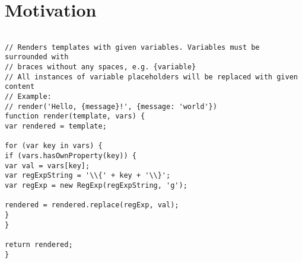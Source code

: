 \section{Motivation}


\begin{verbatim}

// Renders templates with given variables. Variables must be surrounded with
// braces without any spaces, e.g. {variable}
// All instances of variable placeholders will be replaced with given content
// Example:
// render('Hello, {message}!', {message: 'world'})
function render(template, vars) {
var rendered = template;

for (var key in vars) {
if (vars.hasOwnProperty(key)) {
var val = vars[key];
var regExpString = '\\{' + key + '\\}';
var regExp = new RegExp(regExpString, 'g');

rendered = rendered.replace(regExp, val);
}
}

return rendered;
}
\end{verbatim}

